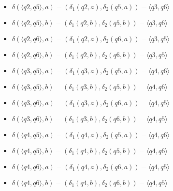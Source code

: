 \documentclass[12pt, a4paper]{article}
\begin{document}
\begin{enumerate}
\begin{itemize}
\begin{itemize}
        \item \(\delta(\langle q2,q5 \rangle,a)=(\delta_1(q2,a),\delta_2(q5,a))=\langle q3,q6 \rangle\)
        \item \(\delta(\langle q2,q5 \rangle,b)=(\delta_1(q2,b),\delta_2(q5,b))=\langle q3,q6 \rangle\)
        \item \(\delta(\langle q2,q6 \rangle,a)=(\delta_1(q2,a),\delta_2(q6,a))=\langle q3,q5 \rangle\)
        \item \(\delta(\langle q2,q6 \rangle,b)=(\delta_1(q2,b),\delta_2(q6,b))=\langle q3,q5 \rangle\)
        
        \item \(\delta(\langle q3,q5 \rangle,a)=(\delta_1(q3,a),\delta_2(q5,a))=\langle q4,q6 \rangle\)
        \item \(\delta(\langle q3,q5 \rangle,b)=(\delta_1(q3,b),\delta_2(q5,b))=\langle q4,q6 \rangle\)
        \item \(\delta(\langle q3,q6 \rangle,a)=(\delta_1(q3,a),\delta_2(q6,a))=\langle q4,q5 \rangle\)
        \item \(\delta(\langle q3,q6 \rangle,b)=(\delta_1(q3,b),\delta_2(q6,b))=\langle q4,q5 \rangle\)
        
        \item \(\delta(\langle q4,q5 \rangle,a)=(\delta_1(q4,a),\delta_2(q5,a))=\langle q4,q6 \rangle\)
        \item \(\delta(\langle q4,q5 \rangle,b)=(\delta_1(q4,b),\delta_2(q5,b))=\langle q4,q6 \rangle\)
        \item \(\delta(\langle q4,q6 \rangle,a)=(\delta_1(q4,a),\delta_2(q6,a))=\langle q4,q5 \rangle\)
        \item \(\delta(\langle q4,q6 \rangle,b)=(\delta_1(q4,b),\delta_2(q6,b))=\langle q4,q5 \rangle\)
    \end{itemize}
\end{itemize}

\begin{comment}
digraph {
    rankdir="LR"
    "" [shape=point]
    q1q5 [shape=circle]
    q2q6 [shape=circle]
    q1q6 [shape=circle]
    q2q5 [shape=circle]
    q3q6 [shape=circle]
    q3q5 [shape=circle]
    q4q6 [shape=doublecircle]
    q4q5 [shape=circle]
    
    "" -> q1q5
    q1q5 -> q2q6 [label="a,b"]
    q1q6 -> q2q5 [label="a,b"]
    q2q5 -> q3q6 [label="a,b"]
    q2q6 -> q3q5 [label="a,b"]
    q3q5 -> q4q6 [label="a,b"]
    q3q6 -> q4q5 [label="a,b"]
    q4q5 -> q4q6 [label="a,b"]
    q4q6 -> q4q5 [label="a,b"]
}
\end{comment}


\end{enumerate}
\end{document}
